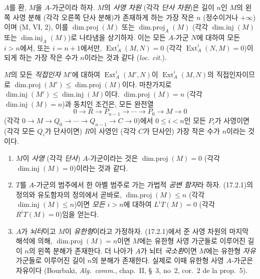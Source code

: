 \begin{env}[17.2.1]
\label{0.17.2.1-fr}
$A$를 환, $M$을 $A$-가군이라 하자. $M$의 \emph{사영 차원} (각각
\emph{단사 차원})은 길이 $n$인 $M$의 왼쪽 사영 분해 (각각 오른쪽
단사 분해)가 존재하게 하는 가장 작은 $n$ (정수이거나 $+\infty$)이며
(M, VI, 2), 이를 $\operatorname{dim.proj}(M)$ 또는
$\operatorname{dim.proj}_A(M)$ (각각
$\operatorname{dim.inj}(M)$ 또는 $\operatorname{dim.inj}_A(M)$)로
나타냄을 상기하자. 이는 모든 $A$-가군 $N$에 대하여 모든 $i>n$에서,
또는 $i=n+1$에서만,
$\operatorname{Ext}^i_A(M,N)=0$ (각각
$\operatorname{Ext}^i_A(N,M)=0$)이 되게 하는 가장 작은 수가 $n$이라는
것과 같다 (\emph{loc. cit.}).

$M$의 모든 \emph{직접인자} $M'$에 대하여
$\operatorname{Ext}^i_A(M',N)$이 $\operatorname{Ext}^i_A(M,N)$의
직접인자이므로
$\operatorname{dim.proj}(M')\leq\operatorname{dim.proj}(M)$이다.
마찬가지로
$\operatorname{dim.inj}(M')\leq\operatorname{dim.inj}(M)$이다.
$\operatorname{dim.proj}(M)=n$ (각각
$\operatorname{dim.inj}(M)=n$)과 동치인 조건은, 모든 완전열
\[
  0\longrightarrow R\longrightarrow P_{n-1}\longrightarrow\cdots
  \longrightarrow P_0\longrightarrow M\longrightarrow0
\]
(각각
$0\longrightarrow M\longrightarrow Q_0\longrightarrow\cdots
\longrightarrow Q_{n-1}\longrightarrow C\longrightarrow0$)에서
$0\leq i<n$인 모든 $P_i$가 사영이면 (각각 모든 $Q_i$가 단사이면)
$R$이 사영인 (각각 $C$가 단사인) 가장 작은 수가 $n$이라는 것이다.
\end{env}

\begin{remarks}[17.2.2]
\label{0.17.2.2-fr}
\begin{enumerate}
  \item[\rm (i)] $M$이 \emph{사영} (각각 \emph{단사}) $A$-가군이라는
  것은 $\operatorname{dim.proj}(M)=0$ (각각
  $\operatorname{dim.inj}(M)=0$)이라는 것과 같다.
  \item[\rm (ii)] $T$를 $A$-가군의 범주에서 한 아벨 범주로 가는
  가법적 \emph{공변 함자}라 하자. (17.2.1)의 정의와 유도함자의 정의에서
  곧바로, $\operatorname{dim.proj}(M)\leq n$ (각각
  $\operatorname{dim.inj}(M)\leq n$)이면
  \emph{모든 $i>n$}에 대하여 $L^iT(M)=0$ (각각 $R^iT(M)=0$)임을
  얻는다.
  \item[\rm (iii)] $A$가 \emph{뇌터}이고 $M$이 \emph{유한형}이라고
  가정하자. (17.2.1)에서 준 사영 차원의 마지막 해석에 의해,
  $\operatorname{dim.proj}(M)=n$이면 $M$에는 유한형 사영 가군들로
  이루어진 길이 $n$의 왼쪽 분해가 존재한다. 더 나아가 $A$가 뇌터
  \emph{국소환}이면 $M$에는 유한형 \emph{자유} 가군들로 이루어진 길이
  $n$의 분해가 존재한다. 실제로 이때 유한형 사영 $A$-가군은 자유이다
  (Bourbaki, \emph{Alg.~comm.}, chap.~II, \S~3, no~2, cor.~2 de la
  prop.~5).
\end{enumerate}
\end{remarks}

